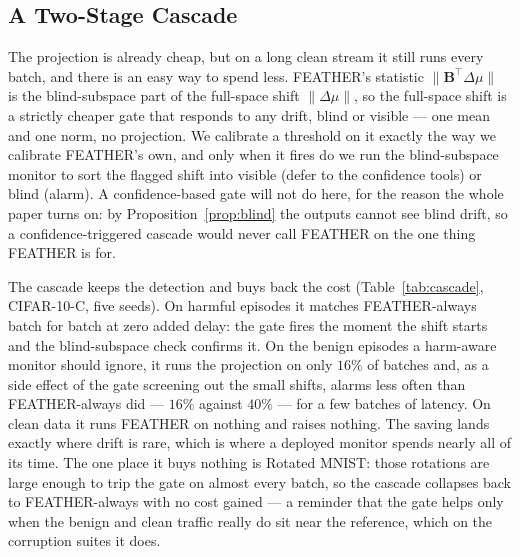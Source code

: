 \documentclass[graybox]{SNmult}
\begin{document}
\subsection{A Two-Stage Cascade}
\label{sec:cascade}

The projection is already cheap, but on a long clean stream it still runs every
batch, and there is an easy way to spend less. FEATHER's statistic
$\|\mathbf{B}^\top\Delta\mu\|$ is the blind-subspace part of the full-space
shift $\|\Delta\mu\|$, so the full-space shift is a strictly cheaper gate that
responds to any drift, blind or visible --- one mean and one norm, no
projection. We calibrate a threshold on it exactly the way we calibrate
FEATHER's own, and only when it fires do we run the blind-subspace monitor to
sort the flagged shift into visible (defer to the confidence tools) or blind
(alarm). A confidence-based gate will not do here, for the reason the whole
paper turns on: by Proposition~\ref{prop:blind} the outputs cannot see blind
drift, so a confidence-triggered cascade would never call FEATHER on the one
thing FEATHER is for.

The cascade keeps the detection and buys back the cost
(Table~\ref{tab:cascade}, CIFAR-10-C, five seeds). On harmful episodes it
matches FEATHER-always batch for batch at zero added delay: the gate fires the
moment the shift starts and the blind-subspace check confirms it. On the benign
episodes a harm-aware monitor should ignore, it runs the projection on only
$16\%$ of batches and, as a side effect of the gate screening out the small
shifts, alarms less often than FEATHER-always did --- $16\%$ against $40\%$ ---
for a few batches of latency. On clean data it runs FEATHER on nothing and
raises nothing. The saving lands exactly where drift is rare, which is where a
deployed monitor spends nearly all of its time. The one place it buys nothing
is Rotated MNIST: those rotations are large enough to trip the gate on almost
every batch, so the cascade collapses back to FEATHER-always with no cost
gained --- a reminder that the gate helps only when the benign
and clean traffic really do sit near the reference, which on the corruption
suites it does.
\end{document}
